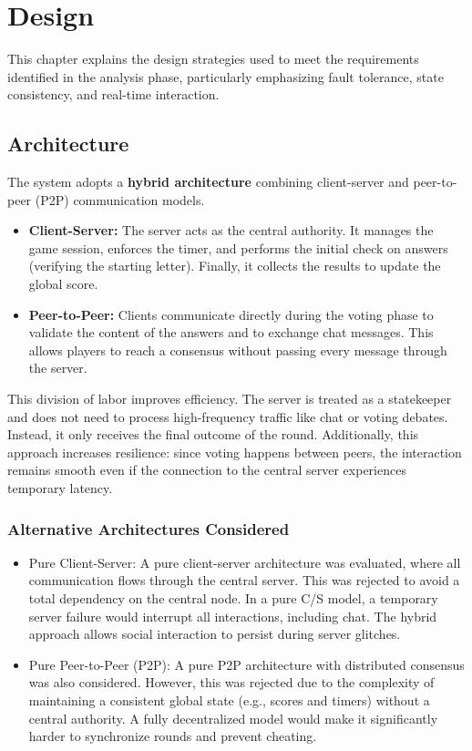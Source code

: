 \documentclass{scrartcl}
\begin{document}
\section{Design}\label{design}

This chapter explains the design strategies used to meet the requirements identified in the analysis phase,
particularly emphasizing fault tolerance, state consistency, and real-time interaction. 

\subsection{Architecture}\label{architecture}

The system adopts a \textbf{hybrid architecture} combining client-server and peer-to-peer (P2P) communication models.

\begin{itemize}
  \item \textbf{Client-Server:} 
  The server acts as the central authority. 
  It manages the game session, enforces the timer, and performs the initial check on answers 
  (verifying the starting letter). 
  Finally, it collects the results to update the global score.

  \item \textbf{Peer-to-Peer:} 
  Clients communicate directly during the voting phase to validate the content of the answers and to exchange chat messages. 
  This allows players to reach a consensus without passing every message through the server.
\end{itemize}

This division of labor improves efficiency. 
The server is treated as a statekeeper and does not need to process high-frequency traffic like chat or voting debates. Instead, it only receives the final outcome of the round.
Additionally, this approach increases resilience: since voting happens between peers, the interaction remains smooth even if the connection to the central server experiences temporary latency.

\subsubsection*{Alternative Architectures Considered}

\begin{itemize}
  \item Pure Client-Server:
  A pure client-server architecture was evaluated, where all communication flows through the central server. 
  This was rejected to avoid a total dependency on the central node. 
  In a pure C/S model, a temporary server failure would interrupt all interactions, including chat.
  The hybrid approach allows social interaction to persist during server glitches.
  \item Pure Peer-to-Peer (P2P):
  A pure P2P architecture with distributed consensus was also considered. 
  However, this was rejected due to the complexity of maintaining a consistent global state 
  (e.g., scores and timers) without a central authority. 
  A fully decentralized model would make it significantly harder to synchronize rounds and prevent cheating.
\end{itemize}
\end{document}
